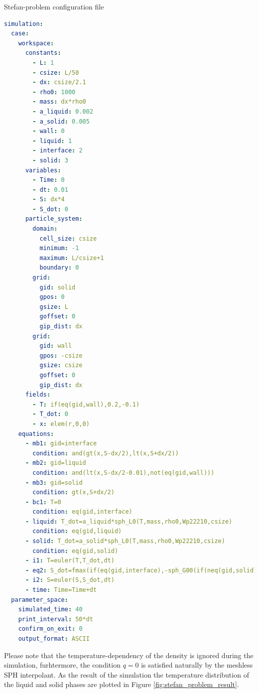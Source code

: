 \documentclass[a4paper,12pt,openany]{book}
\theoremstyle{break}
\begin{document}
\begin{samepage}
\begin{example}{Stefan-problem configuration file}{}
\lstset{basicstyle=\tiny}
\begin{lstlisting}[language=YAML]
simulation:
  case:
    workspace:
      constants:
        - L: 1
        - csize: L/50
        - dx: csize/2.1
        - rho0: 1000
        - mass: dx*rho0
        - a_liquid: 0.002
        - a_solid: 0.005
        - wall: 0
        - liquid: 1
        - interface: 2
        - solid: 3
      variables:
        - Time: 0
        - dt: 0.01
        - S: dx*4
        - S_dot: 0
      particle_system:
        domain:
          cell_size: csize
          minimum: -1
          maximum: L/csize+1
          boundary: 0
        grid:
          gid: solid
          gpos: 0
          gsize: L
          goffset: 0
          gip_dist: dx
        grid:
          gid: wall
          gpos: -csize
          gsize: csize
          goffset: 0
          gip_dist: dx
      fields:
        - T: if(eq(gid,wall),0.2,-0.1)
        - T_dot: 0
        - x: elem(r,0,0)
    equations:
      - mb1: gid=interface
        condition: and(gt(x,S-dx/2),lt(x,S+dx/2))
      - mb2: gid=liquid
        condition: and(lt(x,S-dx/2-0.01),not(eq(gid,wall)))
      - mb3: gid=solid
        condition: gt(x,S+dx/2)
      - bc1: T=0
        condition: eq(gid,interface)
      - liquid: T_dot=a_liquid*sph_L0(T,mass,rho0,Wp22210,csize)
        condition: eq(gid,liquid)
      - solid: T_dot=a_solid*sph_L0(T,mass,rho0,Wp22210,csize)
        condition: eq(gid,solid)
      - i1: T=euler(T,T_dot,dt)
      - eq2: S_dot=fmax(if(eq(gid,interface),-sph_G00(if(neq(gid,solid),T,0),mass,rho0,Wp22210,csize),0))
      - i2: S=euler(S,S_dot,dt)
      - time: Time=Time+dt
  parameter_space:
    simulated_time: 40
    print_interval: 50*dt
    confirm_on_exit: 0
    output_format: ASCII
\end{lstlisting}
\end{example}
\end{samepage}
Please note that the temperature-dependency of the density is ignored during the simulation, furhtermore, the condition $q=0$ is satisfied naturally by the meshless SPH interpolant. As the result of the simulation the temperature distribution of the liquid and solid phases are plotted in Figure \ref{fig:stefan_problem_result}.
\end{document}
